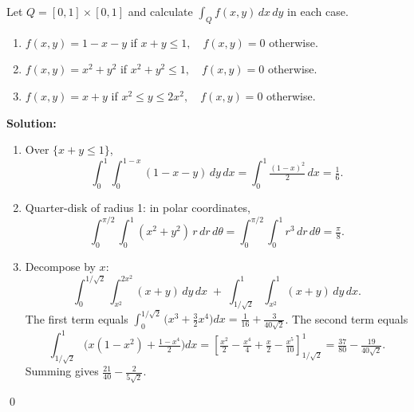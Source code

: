 \begin{problembox}
Let \( Q = [0, 1] \times [0, 1] \) and calculate \( \int_{Q} f(x, y) \, dx \, dy \) in each case.
\begin{enumerate}[label=(\alph*)]
    \item \( f(x, y) = 1 - x - y \) if \( x + y \leq 1, \quad f(x, y) = 0 \) otherwise.
    \item \( f(x, y) = x^2 + y^2 \) if \( x^2 + y^2 \leq 1, \quad f(x, y) = 0 \) otherwise.
    \item \( f(x, y) = x + y \) if \( x^2 \leq y \leq 2x^2, \quad f(x, y) = 0 \) otherwise.
\end{enumerate}
\end{problembox}

\noindent\textbf{Solution:}
\begin{enumerate}[label=(\alph*)]
    \item Over $\{x+y\le 1\}$,
    \[ \int_0^1 \!\int_0^{1-x} (1-x-y)\,dy\,dx = \int_0^1 \tfrac{(1-x)^2}{2}\,dx = \tfrac{1}{6}. \]
    \item Quarter-disk of radius 1: in polar coordinates,
    \[ \int_0^{\pi/2}\!\int_0^1 (x^2+y^2)\,r\,dr\,d\theta = \int_0^{\pi/2}\!\int_0^1 r^3\,dr\,d\theta = \tfrac{\pi}{8}. \]
    \item Decompose by $x$:
    \[ \int_0^{1/\sqrt{2}} \!\int_{x^2}^{2x^2} (x+y)\,dy\,dx\; +\; \int_{1/\sqrt{2}}^{1} \!\int_{x^2}^{1} (x+y)\,dy\,dx. \]
    The first term equals $\int_0^{1/\sqrt{2}} \big(x^3+\tfrac{3}{2}x^4\big)dx= \tfrac{1}{16}+\tfrac{3}{40\sqrt{2}}$. The second term equals
    \[ \int_{1/\sqrt{2}}^{1} \Big(x(1-x^2)+\tfrac{1-x^4}{2}\Big)dx = \left[\tfrac{x^2}{2}-\tfrac{x^4}{4}+\tfrac{x}{2}-\tfrac{x^5}{10}\right]_{1/\sqrt{2}}^{1} = \tfrac{37}{80}-\tfrac{19}{40\sqrt{2}}. \]
    Summing gives $\tfrac{21}{40}-\tfrac{2}{5\sqrt{2}}$.
\end{enumerate}\qed


